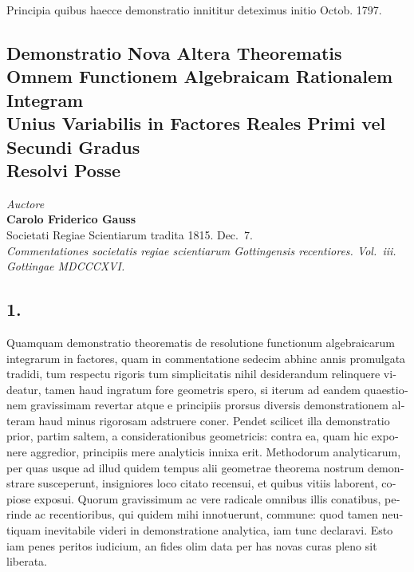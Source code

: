 \documentclass[12pt,a4paper]{article}
\begin{document}
\begin{otherlanguage}{latin}
Principia quibus haecce demonstratio innititur deteximus initio Octob. 1797.

\end{otherlanguage}

\clearpage
\setcounter{page}{33}

\begin{otherlanguage}{latin}
\section*{\centering Demonstratio Nova Altera Theorematis\\ Omnem Functionem Algebraicam Rationalem Integram\\ Unius Variabilis in Factores Reales Primi vel Secundi Gradus\\ Resolvi Posse}
\begin{center}
\textit{Auctore}\\[0.3cm]
\textbf{Carolo Friderico Gauss}\\[0.5cm]
Societati Regiae Scientiarum tradita 1815. Dec.~7.\\[0.3cm]
\textit{Commentationes societatis regiae scientiarum Gottingensis recentiores. Vol.~iii.\\
Gottingae MDCCCXVI.}
\end{center}

\subsection*{1.}
Quamquam demonstratio theorematis de resolutione functionum algebraicarum integrarum in factores, quam in commentatione sedecim abhinc annis promulgata tradidi, tum respectu rigoris tum simplicitatis nihil desiderandum relinquere videatur, tamen haud ingratum fore geometris spero, si iterum ad eandem quaestionem gravissimam revertar atque e principiis prorsus diversis demonstrationem alteram haud minus rigorosam adstruere coner. Pendet scilicet illa demonstratio prior, partim saltem, a considerationibus geometricis: contra ea, quam hic exponere aggredior, principiis mere analyticis innixa erit. Methodorum analyticarum, per quas usque ad illud quidem tempus alii geometrae theorema nostrum demonstrare susceperunt, insigniores loco citato recensui, et quibus vitiis laborent, copiose exposui. Quorum gravissimum ac vere radicale omnibus illis conatibus, perinde ac recentioribus, qui quidem mihi innotuerunt, commune: quod tamen neutiquam inevitabile videri in demonstratione analytica, iam tunc declaravi. Esto iam penes peritos iudicium, an fides olim data per has novas curas pleno sit liberata.


\end{otherlanguage}
\end{document}
